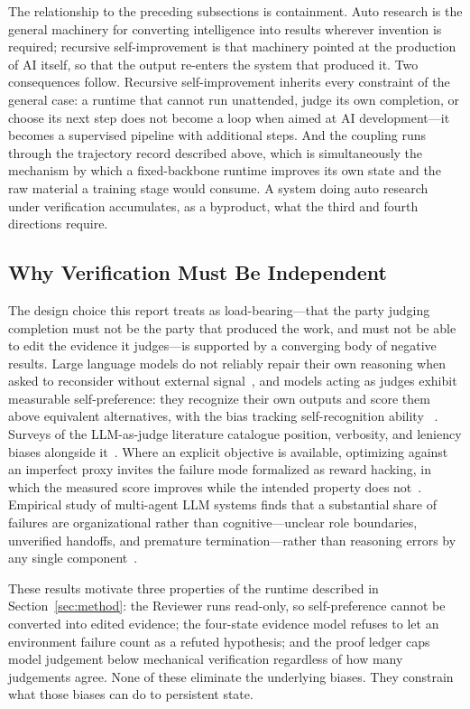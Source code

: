 The relationship to the preceding subsections is containment. Auto research is the
general machinery for converting intelligence into results wherever invention is
required; recursive self-improvement is that machinery pointed at the production of
AI itself, so that the output re-enters the system that produced it. Two consequences
follow. Recursive self-improvement inherits every constraint of the general case: a
runtime that cannot run unattended, judge its own completion, or choose its next step
does not become a loop when aimed at AI development---it becomes a supervised
pipeline with additional steps. And the coupling runs through the trajectory record
described above, which is simultaneously the mechanism by which a fixed-backbone
runtime improves its own state and the raw material a training stage would consume. A
system doing auto research under verification accumulates, as a byproduct, what the
third and fourth directions require.

\subsection{Why Verification Must Be Independent}

The design choice this report treats as load-bearing---that the party judging
completion must not be the party that produced the work, and must not be able to edit
the evidence it judges---is supported by a converging body of negative results. Large
language models do not reliably repair their own reasoning when asked to reconsider
without external signal~\citep{huang2024selfcorrect}, and models acting as judges
exhibit measurable self-preference: they recognize their own outputs and score them
above equivalent alternatives, with the bias tracking self-recognition ability
~\citep{panickssery2024selfrecognition,wataoka2024selfpreference}. Surveys of the
LLM-as-judge literature catalogue position, verbosity, and leniency biases alongside
it~\citep{gu2024judgesurvey}. Where an explicit objective is
available, optimizing against an imperfect proxy invites the failure mode formalized
as reward hacking, in which the measured score improves while the intended property
does not~\citep{skalse2022rewardhacking}. Empirical study of multi-agent LLM systems
finds that a substantial share of failures are organizational rather than
cognitive---unclear role boundaries, unverified handoffs, and premature
termination---rather than reasoning errors by any single
component~\citep{cemri2025multiagentfail}.

These results motivate three properties of the runtime described in
Section~\ref{sec:method}: the Reviewer runs read-only, so self-preference cannot be
converted into edited evidence; the four-state evidence model refuses to let an
environment failure count as a refuted hypothesis; and the proof ledger caps
model judgement below mechanical verification regardless of how many judgements
agree. None of these eliminate the underlying biases. They constrain what those
biases can do to persistent state.

